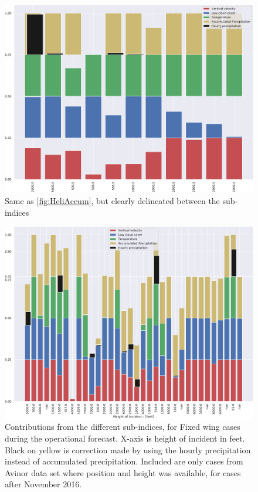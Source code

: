 \begin{figure}
    \centering
    \includegraphics[width=\textwidth]{Figures/HeliDecomp.pdf}
    \caption{Same as \ref{fig:HeliAccum}, but clearly delineated between the sub-indices}
    \label{fig:HeliDecomp}
\end{figure}

\begin{figure}
    \centering
    \includegraphics[width=\textwidth]{Figures/FWAccum.pdf}
    \caption{Contributions from the different sub-indices, for Fixed wing cases during the operational forecast. X-axis is height of incident in feet. Black on yellow is correction made by using the hourly precipitation instead of accumulated precipitation. Included are only cases from Avinor data set where position and height was available, for cases after November 2016.}
    \label{fig:FWAccum}
\end{figure}

